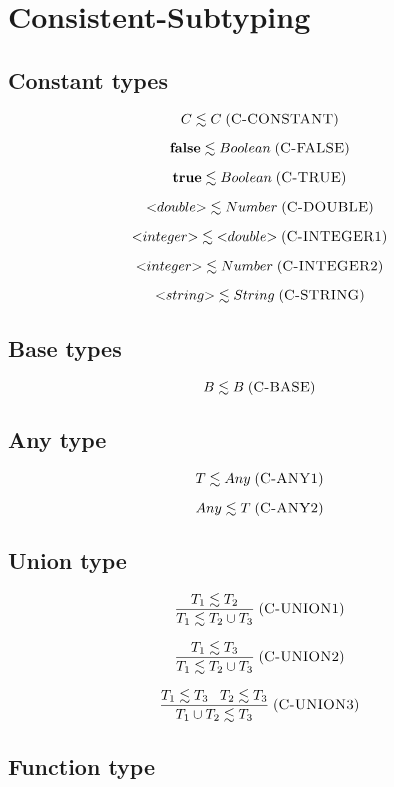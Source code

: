 \documentclass[12pt]{article}
\newcommand{\mylabel}[1]{\; (\textsc{#1})}
\begin{document}
\section{Consistent-Subtyping}

\subsection{Constant types}

\[
C \lesssim C
\mylabel{C-CONSTANT}
\]

\[
\mathbf{false} \lesssim Boolean
\mylabel{C-FALSE}
\]

\[
\mathbf{true} \lesssim Boolean
\mylabel{C-TRUE}
\]

\[
{<}double{>} \lesssim Number
\mylabel{C-DOUBLE}
\]

\[
{<}integer{>} \lesssim {<}double{>}
\mylabel{C-INTEGER1}
\]

\[
{<}integer{>} \lesssim Number
\mylabel{C-INTEGER2}
\]

\[
{<}string{>} \lesssim String
\mylabel{C-STRING}
\]

\subsection{Base types}

\[
B \lesssim B
\mylabel{C-BASE}
\]

\subsection{Any type}

\[
T \lesssim Any
\mylabel{C-ANY1}
\]

\[
Any \lesssim T
\mylabel{C-ANY2}
\]

\subsection{Union type}

\[
\frac{T_{1} \lesssim T_{2}}
     {T_{1} \lesssim T_{2} \cup T_{3}}
\mylabel{C-UNION1}
\]

\[
\frac{T_{1} \lesssim T_{3}}
     {T_{1} \lesssim T_{2} \cup T_{3}}
\mylabel{C-UNION2}
\]

\[
\frac{T_{1} \lesssim T_{3} \;\;\; T_{2} \lesssim T_{3}}
     {T_{1} \cup T_{2} \lesssim T_{3}}
\mylabel{C-UNION3}
\]

\subsection{Function type}
\end{document}
